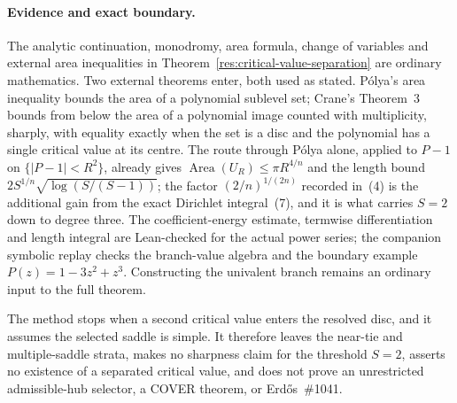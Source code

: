 \paragraph{Evidence and exact boundary.}
\label{bdry:critical-value-separation}
The analytic continuation, monodromy, area formula, change of variables and
external area inequalities in Theorem~\ref{res:critical-value-separation} are
ordinary mathematics.  Two external theorems enter, both used as stated.
P\'olya's area inequality \cite[printed pp.~280--282]{polya1928} bounds the
area of a polynomial sublevel set; Crane's Theorem~3 \cite{crane} bounds from
below the area of a polynomial image counted with multiplicity, sharply, with
equality exactly when the set is a disc and the polynomial has a single
critical value at its centre.  The route through P\'olya alone, applied to
$P-1$ on $\{|P-1|<R^2\}$, already gives
$\operatorname{Area}(U_R)\le\pi R^{4/n}$ and the length bound
$2S^{1/n}\sqrt{\log(S/(S-1))}$; the factor $(2/n)^{1/(2n)}$ recorded in~(4) is
the additional gain from the exact Dirichlet integral~(7), and it is what
carries $S=2$ down to degree three.  The coefficient-energy estimate, termwise
differentiation and length integral are Lean-checked for the actual power
series; the companion symbolic replay checks the branch-value algebra and the
boundary example $P(z)=1-3z^2+z^3$.  Constructing the univalent branch remains
an ordinary input to the full theorem.

The method stops when a
second critical value enters the resolved disc, and it assumes the selected
saddle is simple.  It therefore leaves the near-tie and multiple-saddle
strata, makes no sharpness claim for the threshold $S=2$, asserts no existence
of a separated critical value, and does not prove an unrestricted
admissible-hub selector, a COVER theorem, or Erd\H{o}s~\#1041.

